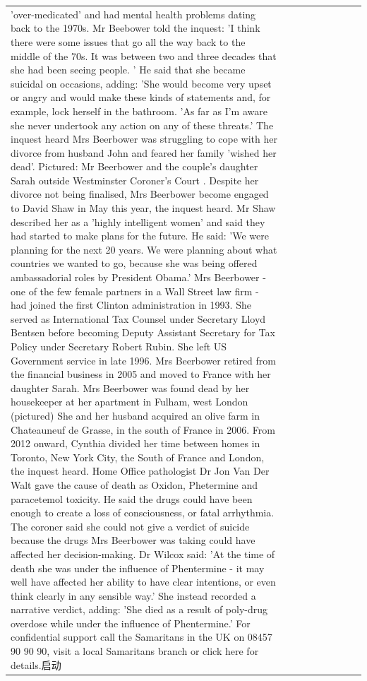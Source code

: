 \begin{table}[H]
\begin{tabular}{lllrlllll}
'over-medicated' and had mental health problems dating back to the 1970s. Mr Beebower told the inquest: 'I think there were some issues that go all the way back to the middle of the 70s. It was between two and three decades that she had been seeing people. ' He said that she became suicidal on occasions, adding: 'She would become very upset or angry and would make these kinds of statements and, for example, lock herself in the bathroom. 'As far as I'm aware she never undertook any action on any of these threats.' The inquest heard Mrs Beerbower was struggling to cope with her divorce from husband John and feared her family 'wished her dead'. Pictured: Mr Beerbower and the couple's daughter Sarah outside Westminster Coroner's Court . Despite her divorce not being finalised, Mrs Beerbower become engaged to David Shaw in May this year, the inquest heard. Mr Shaw described her as a 'highly intelligent women' and said they had started to make plans for the future. He said: 'We were planning for the next 20 years. We were planning about what countries we wanted to go, because she was being offered ambassadorial roles by President Obama.' Mrs Beerbower - one of the few female partners in a Wall Street law firm - had joined the first Clinton administration in 1993. She served as International Tax Counsel under Secretary Lloyd Bentsen before becoming Deputy Assistant Secretary for Tax Policy under Secretary Robert Rubin. She left US Government service in late 1996. Mrs Beerbower retired from the financial business in 2005 and moved to France with her daughter Sarah. Mrs Beerbower was found dead by her housekeeper at her apartment in Fulham, west London (pictured) She and her husband acquired an olive farm in Chateauneuf de Grasse, in the south of France in 2006. From 2012 onward, Cynthia divided her time between homes in Toronto, New York City, the South of France and London, the inquest heard. Home Office pathologist Dr Jon Van Der Walt gave the cause of death as Oxidon, Phetermine and paracetemol toxicity. He said the drugs could have been enough to create a loss of consciousness, or fatal arrhythmia. The coroner said she could not give a verdict of suicide because the drugs Mrs Beerbower was taking could have affected her decision-making. Dr Wilcox said: 'At the time of death she was under the influence of Phentermine - it may well have affected her ability to have clear intentions, or even think clearly in any sensible way.' She instead recorded a narrative verdict, adding: 'She died as a result of poly-drug overdose while under the influence of Phentermine.' For confidential support call the Samaritans in the UK on 08457 90 90 90, visit a local Samaritans branch or click here for details.启动 \\

\end{tabular}
\end{table}
